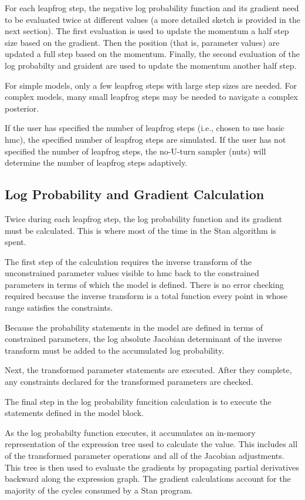 \documentclass[10pt]{report}
\newcommand{\Stan}{Stan\xspace}
\newcommand{\acronym}[1]{{\sc #1}\xspace}
\newcommand{\HMC}{\acronym{hmc}}
\newcommand{\NUTS}{\acronym{nuts}}
\begin{document}
For each leapfrog step, the negative log probability function and its
gradient need to be evaluated twice at different values (a more
detailed sketch is provided in the next section).  The first
evaluation is used to update the momentum a half step size based on
the gradient.  Then the position (that is, parameter values) are
updated a full step based on the momentum.  Finally, the second
evaluation of the log probabilty and graident are used to update the
momentum another half step.

For simple models, only a few leapfrog steps with large step sizes are
needed.  For complex models, many small leapfrog steps may be needed
to navigate a complex posterior.

If the user has specified the number of leapfrog steps (i.e., chosen
to use basic \HMC), the specified number of leapfrog steps are
simulated.  If the user has not specified the number of leapfrog
steps, the no-U-turn sampler (\NUTS) will determine the number of
leapfrog steps adaptively.

\subsection{Log Probability and Gradient Calculation}

Twice during each leapfrog step, the log probability function and its
gradient must be calculated.  This is where most of the time in the
\Stan algorithm is spent.

The first step of the calculation requires the inverse transform of
the unconstrained parameter values visible to \HMC back to the
constrained parameters in terms of which the model is defined.  There
is no error checking required because the inverse transform is 
a total function every point in whose range satisfies the constraints.

Because the probability statements in the model are defined in terms
of constrained parameters, the log absolute Jacobian determinant of
the inverse transform must be added to the accumulated log
probability.

Next, the transformed parameter statements are executed.  After they
complete, any constraints declared for the transformed parameters are
checked.  

The final step in the log probability funcition calculation is to
execute the statements defined in the model block.  

As the log probabilty function executes, it accumulates an in-memory
representation of the expression tree used to calculate the value.
This includes all of the transformed parameter operations and all of
the Jacobian adjustments.  This tree is then used to evaluate the
gradients by propagating partial derivatives backward along the
expression graph.  The gradient calculations account for the majority
of the cycles consumed by a \Stan program.
\end{document}
